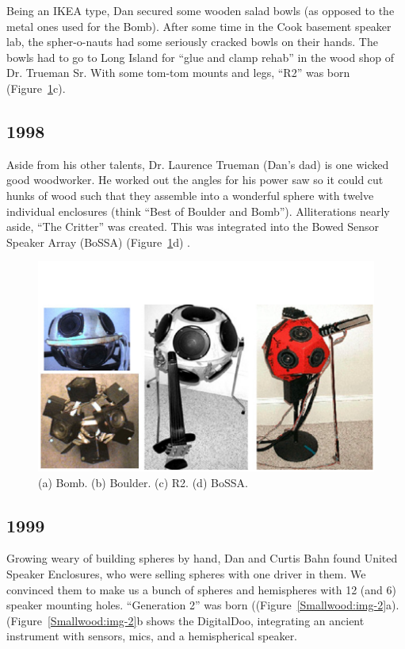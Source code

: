 Being an IKEA type, Dan secured some wooden salad bowls (as opposed to the metal
ones used for the Bomb). After some time in the Cook basement speaker lab, the
spher-o-nauts had some seriously cracked bowls on their hands. The bowls had to
go to Long Island for ``glue and clamp rehab'' in the wood shop of Dr. Trueman
Sr. With some tom-tom mounts and legs, ``R2'' was born (Figure~\ref{Smallwood:img-1}c).

\subsection{1998}

Aside from his other talents, Dr. Laurence Trueman (Dan's dad) is one wicked
good woodworker. He worked out the angles for his power saw so it could cut hunks
of wood such that they assemble into a wonderful sphere with twelve individual
enclosures (think ``Best of Boulder and Bomb''). Alliterations nearly aside,
``The Critter'' was created. This was integrated into the Bowed Sensor Speaker
Array (BoSSA) (Figure~\ref{Smallwood:img-1}d) \cite{Trueman:1999}.

\begin{figure}[t]
\centering
\includegraphics[width=\textwidth]{img-1-eps-converted-to-crop.pdf}
\caption{(a) Bomb. (b) Boulder. (c) R2. (d) BoSSA.}
\label{Smallwood:img-1} 
\end{figure}




\subsection{1999}

Growing weary of building spheres by hand, Dan and Curtis Bahn found United
Speaker Enclosures, who were selling spheres with one driver in them. We
convinced them to make us a bunch of spheres and hemispheres with 12 (and 6)
speaker mounting holes. ``Generation 2'' was born ((Figure~\ref{Smallwood:img-2}a). (Figure~\ref{Smallwood:img-2}b shows the
DigitalDoo, integrating an ancient instrument with sensors, mics, and a
hemispherical speaker.

